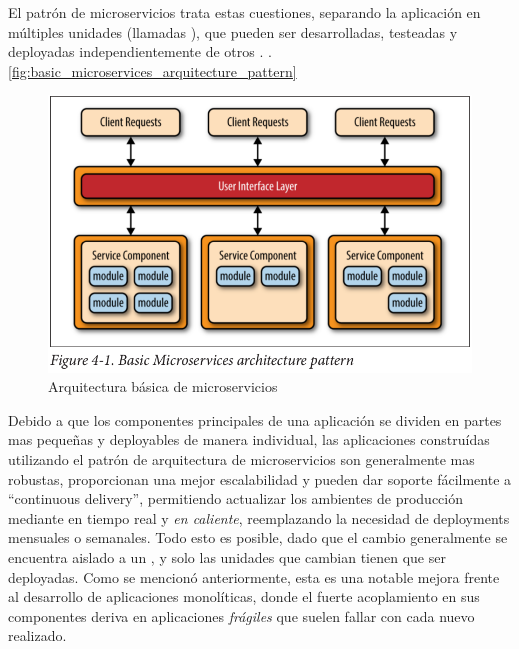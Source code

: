 El patrón de microservicios trata estas cuestiones, separando la aplicación en múltiples unidades  (llamadas ), que pueden ser desarrolladas, testeadas y deployadas independientemente de otros . .\cite[p.~27]{richards2015}
\autoref{fig:basic_microservices_arquitecture_pattern}

\begin{figure}[H]
  \includegraphics[width=\linewidth]{src/images/02-capitulo-2/basic_microservices_arquitecture_pattern.png}
  \caption{Arquitectura básica de microservicios}
  \label{fig:basic_microservices_arquitecture_pattern}
\end{figure}

Debido a que los componentes principales de una aplicación se dividen en partes mas pequeñas y deployables de manera individual, las aplicaciones construídas utilizando el patrón de arquitectura de microservicios son generalmente mas robustas, proporcionan una mejor escalabilidad y pueden dar soporte fácilmente a ``continuous delivery'', permitiendo actualizar los ambientes de producción mediante  en tiempo real y \textit{en caliente}, reemplazando la necesidad de deployments mensuales o semanales. \cite[p.~33]{richards2015} Todo esto es posible, dado que el cambio generalmente se encuentra aislado a un , y solo las unidades que cambian tienen que ser deployadas. Como se mencionó anteriormente, esta es una notable mejora frente al desarrollo de aplicaciones monolíticas, donde el fuerte acoplamiento en sus componentes deriva en aplicaciones \textit{frágiles} que suelen fallar con cada nuevo  realizado.

